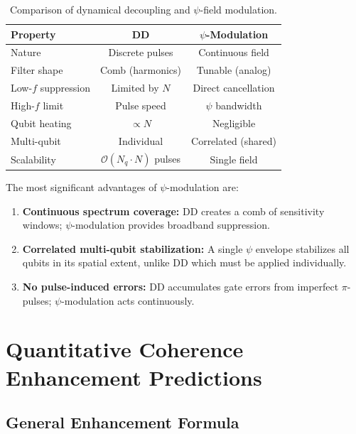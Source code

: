 \documentclass[aps,prd,twocolumn,superscriptaddress,nofootinbib]{revtex4-2}
\newcommand{\order}[1]{\mathcal{O}(#1)}
\begin{document}
\begin{table}[h]
\caption{Comparison of dynamical decoupling and $\psi$-field modulation.}
\label{tab:dd-vs-psi}
\begin{ruledtabular}
\begin{tabular}{lcc}
\textbf{Property} & \textbf{DD} & \textbf{$\psi$-Modulation} \\
\hline
Nature & Discrete pulses & Continuous field \\
Filter shape & Comb (harmonics) & Tunable (analog) \\
Low-$f$ suppression & Limited by $N$ & Direct cancellation \\
High-$f$ limit & Pulse speed & $\psi$ bandwidth \\
Qubit heating & $\propto N$ & Negligible \\
Multi-qubit & Individual & Correlated (shared) \\
Scalability & $\order{N_q \cdot N}$ pulses & Single field \\
\end{tabular}
\end{ruledtabular}
\end{table}

The most significant advantages of $\psi$-modulation are:
\begin{enumerate}
\item \textbf{Continuous spectrum coverage:} DD creates a comb of
sensitivity windows; $\psi$-modulation provides broadband suppression.
\item \textbf{Correlated multi-qubit stabilization:} A single $\psi$
envelope stabilizes all qubits in its spatial extent, unlike DD which
must be applied individually.
\item \textbf{No pulse-induced errors:} DD accumulates gate errors
from imperfect $\pi$-pulses; $\psi$-modulation acts continuously.
\end{enumerate}

\section{Quantitative Coherence Enhancement Predictions}
\label{sec:coherence}

\subsection{General Enhancement Formula}
\end{document}
